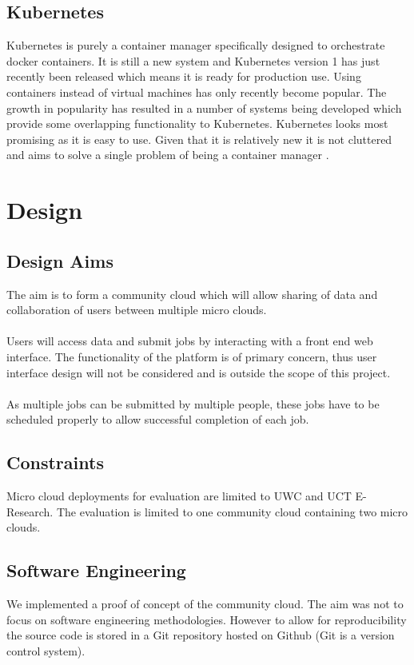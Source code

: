 \documentclass{sig-alternate-05-2015}
\begin{document}
\subsection{Kubernetes}
Kubernetes is purely a container manager specifically designed to orchestrate docker containers. It is still a new system and Kubernetes version 1 has just recently been released which means it is ready for production use. Using containers instead of virtual machines has only recently become popular. The growth in popularity has resulted in a number of systems being developed which provide some overlapping functionality to Kubernetes. Kubernetes looks most promising as it is easy to use. Given that it is relatively new it is not cluttered and aims to solve a single problem of being a container manager \cite{googleborg}. 


\section{Design}


\subsection{Design Aims}
The aim is to form a community cloud which will allow sharing of data and collaboration of users between multiple micro clouds.
\\\\
Users will access data and submit jobs by interacting with a front end web interface. The functionality of the platform is of primary concern, thus user interface design will not be considered and is outside the scope of this project. 
\\\\
As multiple jobs can be submitted by multiple people, these jobs have to be scheduled properly to allow successful completion of each job. 


\subsection{Constraints}
Micro cloud deployments for evaluation are limited to UWC and UCT E-Research. The evaluation is limited to one community cloud containing two micro clouds.

\subsection{Software Engineering}

We implemented a proof of concept of the community cloud. The aim was not to focus on software engineering methodologies. However to allow for reproducibility the source code is stored in a Git repository hosted on Github (Git is a version control system). 
\end{document}
